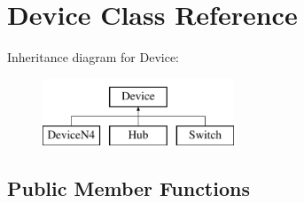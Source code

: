 \hypertarget{class_device}{\section{Device Class Reference}
\label{class_device}
}
Inheritance diagram for Device\-:\begin{figure}[H]
\begin{center}
\leavevmode
\includegraphics[height=2.000000cm]{class_device}
\end{center}
\end{figure}
\subsection*{Public Member Functions}
